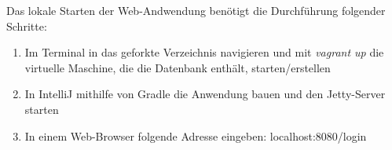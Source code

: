 \documentclass[12pt, oneside, a4paper]{article}		%
\begin{document}
Das lokale Starten der Web-Andwendung benötigt die Durchführung folgender Schritte:

\begin{enumerate}
	\item Im Terminal in das geforkte Verzeichnis navigieren und mit \textit{vagrant up} die virtuelle Maschine, die die Datenbank enthält, starten/erstellen
	\item In IntelliJ mithilfe von Gradle die Anwendung bauen und den Jetty-Server starten
	\item In einem Web-Browser folgende Adresse eingeben: localhost:8080/login
\end{enumerate}
\end{document}
